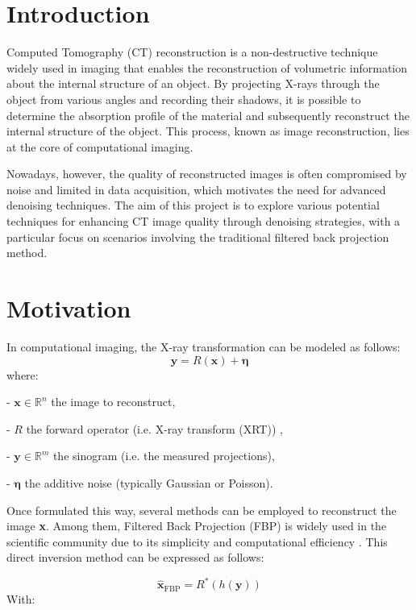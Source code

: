 \documentclass{article}
\begin{document}
\section{Introduction}
Computed Tomography (CT) reconstruction is a non-destructive technique widely  used in imaging that enables the reconstruction of volumetric information about the internal structure of an object. By projecting X-rays through the object from various angles and recording their shadows, it is possible to determine the absorption profile of the material  and subsequently reconstruct the internal structure of the object. This process, known as image reconstruction, lies at the core of computational imaging. 
\medskip

\setlength{\parindent}{0pt}
Nowadays, however, the quality of reconstructed images is often compromised by noise and limited in data acquisition, which motivates the need for advanced denoising techniques. The aim of this project is to explore various potential techniques for enhancing CT image quality through denoising strategies, with a particular focus on scenarios involving the traditional filtered back projection method.

\section{Motivation}
In computational imaging, the X-ray transformation can be modeled as follows:
\begin{equation}
\mathbf{y} = R(\mathbf{x}) + \bm{\eta}
\end{equation}
where:


- \( \mathbf{x} \in \mathbb{R}^n \) the image to reconstruct,

- \( R \) the forward operator (i.e. X-ray transform (XRT)) ,

- \( \mathbf{y} \in \mathbb{R}^m \) the sinogram (i.e. the measured projections),

- \( \bm\eta \) the additive noise (typically Gaussian or Poisson).
\medskip

Once formulated this way, several methods can be employed to reconstruct the image \textbf{x}. Among them, Filtered Back Projection (FBP) is widely used in the scientific community due to its simplicity and computational efficiency \cite{karl_foundations_2023} \cite{koetzier_deep_2023}. This direct inversion method can be expressed as follows:

 \begin{equation}
\hat{\mathbf{x}}_{\mathrm{FBP}} = R^* (h(\mathbf{y}))
\end{equation}
With: 
\end{document}
